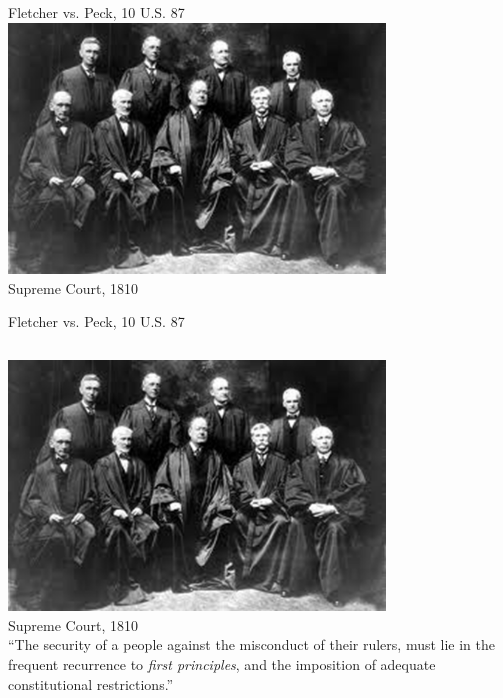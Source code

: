 \begin{frame}{Fletcher vs. Peck, 10 U.S. 87}
    \centering
    \includegraphics[width=0.75\textwidth]{img/supreme-court-1810.png} \\
    Supreme Court, 1810 \\
\end{frame}

\begin{frame}{Fletcher vs. Peck, 10 U.S. 87}
    \begin{columns}[onlytextwidth]
            \centering
            \includegraphics[width=0.75\textwidth]{img/supreme-court-1810.png} \\
            Supreme Court, 1810 \\

            ``The security of a people against the misconduct of their rulers,
            must lie in the frequent recurrence to \emph{first principles}, and
            the imposition of adequate constitutional restrictions.''
    \end{columns}
\end{frame}

